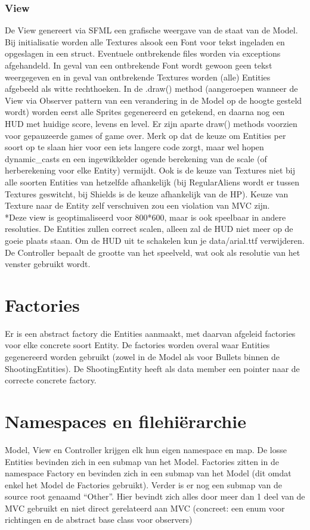 \documentclass[11pt, a4paper]{article}
\begin{document}
\subsubsection{View}
De View genereert via SFML een grafische weergave van de staat van de Model. Bij initialisatie worden alle Textures alsook een Font voor tekst ingeladen en opgeslagen in een struct. Eventuele ontbrekende files worden via exceptions afgehandeld. In geval van een ontbrekende Font wordt gewoon geen tekst weergegeven en in geval van ontbrekende Textures worden (alle) Entities afgebeeld als witte rechthoeken. In de .draw() method (aangeroepen wanneer de View via Observer pattern van een verandering in de Model op de hoogte gesteld wordt) worden eerst alle Sprites gegenereerd en getekend, en daarna nog een HUD met huidige score, levens en level. Er zijn aparte draw() methods voorzien voor gepauzeerde games of game over. Merk op dat de keuze om Entities per soort op te slaan hier voor een iets langere code zorgt, maar wel hopen dynamic\_casts en een ingewikkelder ogende berekening van de scale (of herberekening voor elke Entity) vermijdt. Ook is de keuze van Textures niet bij alle soorten Entities van hetzelfde afhankelijk (bij RegularAliens wordt er tussen Textures geswitcht, bij Shields is de keuze afhankelijk van de HP). Keuze van Texture naar de Entity zelf verschuiven zou een violation van MVC zijn.
\\*Deze view is geoptimaliseerd voor 800*600, maar is ook speelbaar in andere resoluties. De Entities zullen correct scalen, alleen zal de HUD niet meer op de goeie plaats staan. Om de HUD uit te schakelen kun je data/arial.ttf verwijderen. De Controller bepaalt de grootte van het speelveld, wat ook als resolutie van het venster gebruikt wordt.

\section{Factories}
Er is een abstract factory die Entities aanmaakt, met daarvan afgeleid factories voor elke concrete soort Entity. De factories worden overal waar Entities gegenereerd worden gebruikt (zowel in de Model als voor Bullets binnen de ShootingEntities). De ShootingEntity heeft als data member een pointer naar de correcte concrete factory.

\section{Namespaces en filehiërarchie}
 Model, View en Controller krijgen elk hun eigen namespace en map. De losse Entities bevinden zich in een submap van het Model. Factories zitten in de namespace Factory en bevinden zich in een submap van het Model (dit omdat enkel het Model de Factories gebruikt). Verder is er nog een submap van de source root genaamd “Other”. Hier bevindt zich alles door meer dan 1 deel van de MVC gebruikt en niet direct gerelateerd aan MVC (concreet: een enum voor richtingen en de abstract base class voor observers)
\end{document}
